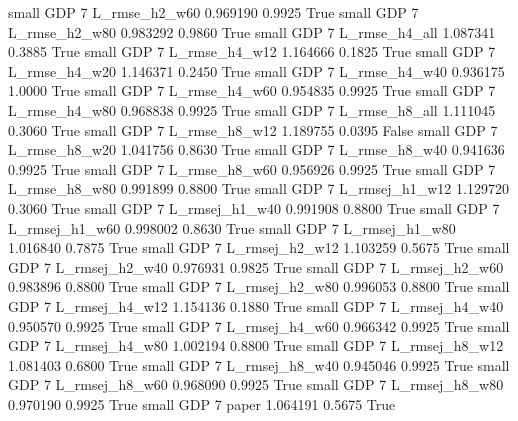     small      GDP                 7  L_rmse_h2_w60   0.969190      0.9925    True
     small      GDP                 7  L_rmse_h2_w80   0.983292      0.9860    True
     small      GDP                 7  L_rmse_h4_all   1.087341      0.3885    True
     small      GDP                 7  L_rmse_h4_w12   1.164666      0.1825    True
     small      GDP                 7  L_rmse_h4_w20   1.146371      0.2450    True
     small      GDP                 7  L_rmse_h4_w40   0.936175      1.0000    True
     small      GDP                 7  L_rmse_h4_w60   0.954835      0.9925    True
     small      GDP                 7  L_rmse_h4_w80   0.968838      0.9925    True
     small      GDP                 7  L_rmse_h8_all   1.111045      0.3060    True
     small      GDP                 7  L_rmse_h8_w12   1.189755      0.0395   False
     small      GDP                 7  L_rmse_h8_w20   1.041756      0.8630    True
     small      GDP                 7  L_rmse_h8_w40   0.941636      0.9925    True
     small      GDP                 7  L_rmse_h8_w60   0.956926      0.9925    True
     small      GDP                 7  L_rmse_h8_w80   0.991899      0.8800    True
     small      GDP                 7 L_rmsej_h1_w12   1.129720      0.3060    True
     small      GDP                 7 L_rmsej_h1_w40   0.991908      0.8800    True
     small      GDP                 7 L_rmsej_h1_w60   0.998002      0.8630    True
     small      GDP                 7 L_rmsej_h1_w80   1.016840      0.7875    True
     small      GDP                 7 L_rmsej_h2_w12   1.103259      0.5675    True
     small      GDP                 7 L_rmsej_h2_w40   0.976931      0.9825    True
     small      GDP                 7 L_rmsej_h2_w60   0.983896      0.8800    True
     small      GDP                 7 L_rmsej_h2_w80   0.996053      0.8800    True
     small      GDP                 7 L_rmsej_h4_w12   1.154136      0.1880    True
     small      GDP                 7 L_rmsej_h4_w40   0.950570      0.9925    True
     small      GDP                 7 L_rmsej_h4_w60   0.966342      0.9925    True
     small      GDP                 7 L_rmsej_h4_w80   1.002194      0.8800    True
     small      GDP                 7 L_rmsej_h8_w12   1.081403      0.6800    True
     small      GDP                 7 L_rmsej_h8_w40   0.945046      0.9925    True
     small      GDP                 7 L_rmsej_h8_w60   0.968090      0.9925    True
     small      GDP                 7 L_rmsej_h8_w80   0.970190      0.9925    True
     small      GDP                 7          paper   1.064191      0.5675    True
